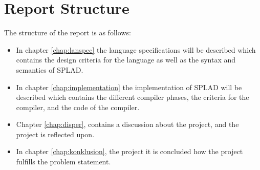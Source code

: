 \section{Report Structure}
The structure of the report is as follows:
\begin{itemize}
	\item In chapter \ref{chap:lanspec} the language specifications will be described which contains the design criteria for the language as well as the syntax and semantics of SPLAD.
	\item In chapter \ref{chap:implementation} the implementation of SPLAD will be described which contains the different compiler phases, the criteria for the compiler, and the code of the compiler.
	\item Chapter \ref{chap:disper}, contains a discussion about the project, and the project is reflected upon. 
	\item In chapter \ref{chap:konklusion}, the project it is concluded how the project fulfills the problem statement.
\end{itemize}